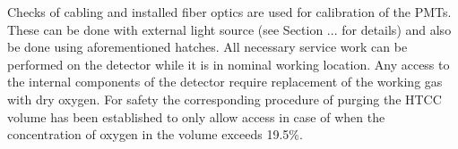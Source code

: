 Checks of cabling and installed fiber optics are used for calibration of the PMTs. These can be done with external light source (see Section ... for details) and also be done using aforementioned hatches. All necessary service work can be performed on the detector while it is in nominal working location. Any access to the internal components of the detector require replacement of the working gas with dry oxygen. For safety the corresponding procedure of purging the HTCC volume has been established to only allow access in case of when the concentration of oxygen in the volume exceeds 19.5\%.
